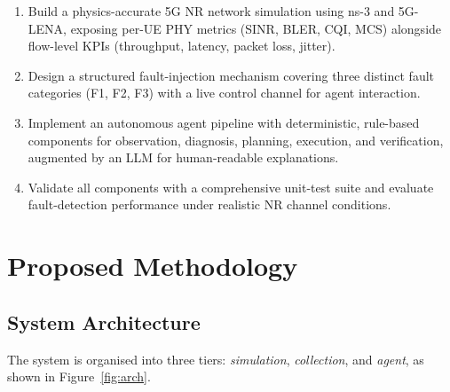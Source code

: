 \documentclass[12pt,a4paper]{article}
\begin{document}
\begin{enumerate}[noitemsep]
  \item Build a physics-accurate 5G NR network simulation using ns-3 and
    5G-LENA, exposing per-UE PHY metrics (SINR, BLER, CQI, MCS) alongside
    flow-level KPIs (throughput, latency, packet loss, jitter).
  \item Design a structured fault-injection mechanism covering three distinct
    fault categories (F1, F2, F3) with a live control channel for agent
    interaction.
  \item Implement an autonomous agent pipeline with deterministic, rule-based
    components for observation, diagnosis, planning, execution, and verification,
    augmented by an LLM for human-readable explanations.
  \item Validate all components with a comprehensive unit-test suite and
    evaluate fault-detection performance under realistic NR channel conditions.
\end{enumerate}

\section{Proposed Methodology}
\label{sec:method}

\subsection{System Architecture}

The system is organised into three tiers: \emph{simulation}, \emph{collection},
and \emph{agent}, as shown in Figure~\ref{fig:arch}.
\end{document}
